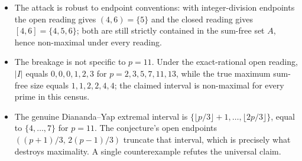 \documentclass[11pt]{article}
\begin{document}
\begin{itemize}
\item The attack is robust to endpoint conventions: with integer-division
endpoints the open reading gives $(4,6) = \{5\}$ and the closed reading gives
$[4,6] = \{4,5,6\}$; both are still strictly contained in the sum-free set
$A$, hence non-maximal under every reading.
\item The breakage is not specific to $p = 11$. Under the exact-rational open
reading, $|I|$ equals $0,0,0,1,2,3$ for $p = 2,3,5,7,11,13$, while the true
maximum sum-free size equals $1,1,2,2,4,4$; the claimed interval is
non-maximal for every prime in this census.
\item The genuine Diananda--Yap extremal interval is
$\{\lfloor p/3 \rfloor + 1, \dots, \lfloor 2p/3 \rfloor\}$, equal to
$\{4,\dots,7\}$ for $p = 11$. The conjecture's open endpoints
$((p+1)/3,\, 2(p-1)/3)$ truncate that interval, which is precisely what
destroys maximality. A single counterexample refutes the universal claim.
\end{itemize}
\end{document}
